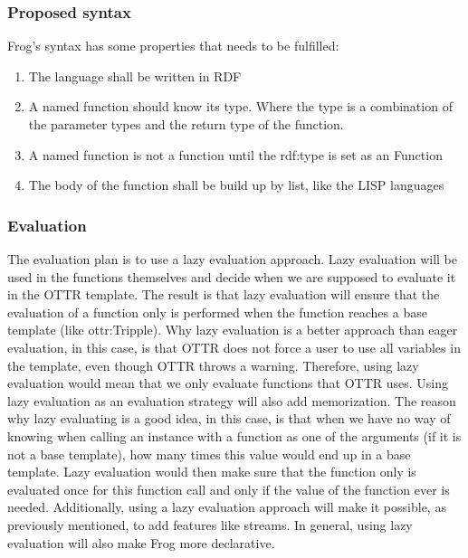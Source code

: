 \subsubsection{Proposed syntax}
Frog's syntax has some properties that needs to be fulfilled: 
\begin{enumerate}
    \item The language shall be written in RDF 
    \item A named function should know its type. Where the type is a combination of the parameter types 
    and the return type of the function.
    \item A named function is not a function until the rdf:type is set as an Function
    \item The body of the function shall be build up by list, like the LISP languages
\end{enumerate}



\subsubsection{Evaluation}
The evaluation plan is to use a lazy evaluation approach. Lazy evaluation will be used in the functions themselves and decide when we are supposed to evaluate it in the OTTR template. The result is that lazy evaluation will ensure that the evaluation of a function only is performed when the function reaches a base template (like ottr:Tripple). Why lazy evaluation is a better approach than eager evaluation, in this case, is that OTTR does not force a user to use all variables in the template, even though OTTR throws a warning. Therefore, using lazy evaluation would mean that we only evaluate functions that OTTR uses. Using lazy evaluation as an evaluation strategy will also add memorization. The reason why lazy evaluating is a good idea, in this case, is that when we have no way of knowing when calling an instance with a function as one of the arguments (if it is not a base template), how many times this value would end up in a base template. Lazy evaluation would then make sure that the function only is evaluated once for this function call and only if the value of the function ever is needed. Additionally, using a lazy evaluation approach will make it possible, as previously mentioned, to add features like streams. In general, using lazy evaluation will also make Frog more declarative.  

